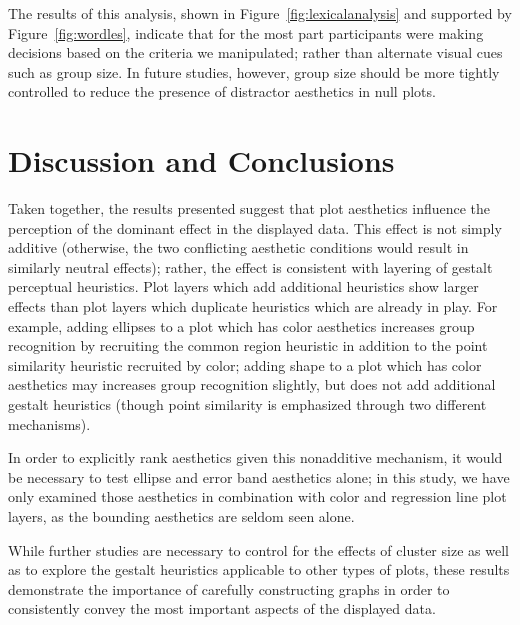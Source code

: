 \documentclass[12pt]{article}\usepackage[]{graphicx}\usepackage[]{color}
\begin{document}
\afterpage{\clearpage}
The results of this analysis, shown in Figure~\ref{fig:lexicalanalysis} and supported by Figure~\ref{fig:wordles}, indicate that for the most part participants were making decisions based on the criteria we manipulated; rather than alternate visual cues such as group size. In future studies, however, group size should be more tightly controlled to reduce the presence of distractor aesthetics in null plots. 


\section{Discussion and Conclusions}\label{sec:Conclusion}

Taken together, the results presented suggest that plot aesthetics influence the perception of the dominant effect in the displayed data. This effect is not simply additive (otherwise, the two conflicting aesthetic conditions would result in similarly neutral effects); rather, the effect is consistent with layering of gestalt perceptual heuristics. Plot layers which add additional heuristics show larger effects than plot layers which duplicate heuristics which are already in play. For example, adding ellipses to a plot which has color aesthetics increases group recognition by recruiting the common region heuristic in addition to the point similarity heuristic recruited by color; adding shape to a plot which has color aesthetics may increases group recognition slightly, but does not add additional gestalt heuristics (though point similarity is emphasized through two different mechanisms). 

In order to explicitly rank aesthetics given this nonadditive mechanism, it would be necessary to test ellipse and error band aesthetics alone; in this study, we have only examined those aesthetics in combination with color and regression line plot layers, as the bounding aesthetics are seldom seen alone. 

While further studies are necessary to control for the effects of cluster size as well as to explore the gestalt heuristics applicable to other types of plots, these results demonstrate the importance of carefully constructing graphs in order to consistently convey the most important aspects of the displayed data. 
\end{document}
